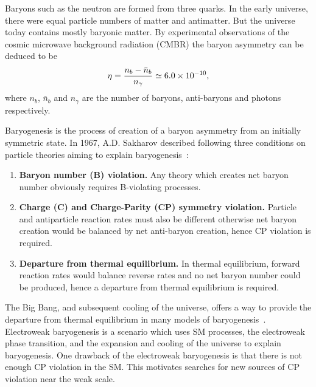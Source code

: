 Baryons such as the neutron are formed from three quarks. In the early universe, there were equal particle numbers of matter and antimatter. But the universe today contains mostly baryonic matter. By experimental observations of the cosmic microwave background radiation (CMBR) the baryon asymmetry can be deduced to be~\cite{expBar}
\begin{equation}\label{eq:baryons}
    \eta =\frac{n_b-\bar{n}_b}{n_\gamma}\simeq 6.0 \times 10^{-10}{\rm ,}
\end{equation}
where $n_b$, $\bar{n}_b$ and ${n_\gamma}$ are the number of baryons, anti-baryons and photons respectively. 



Baryogenesis is the process of creation of a baryon asymmetry from an initially symmetric state. In 1967, A.D. Sakharov described following three conditions on particle theories aiming to explain baryogenesis~\cite{Sakharov:1967dj}:
\begin{enumerate}
    \item {\bf Baryon number (B) violation.} Any theory which creates net baryon number obviously requires B-violating processes.
    \item {\bf Charge (C) and Charge-Parity (CP) symmetry violation.} Particle and antiparticle reaction rates must also be different otherwise net baryon creation would be balanced by net anti-baryon creation, hence CP violation is required.
    \item {\bf Departure from thermal equilibrium.} In thermal equilibrium, forward reaction rates would balance reverse rates and no net baryon number could be produced, hence a departure from thermal equilibrium is required.
\end{enumerate}

The Big Bang, and subsequent cooling of the universe, offers a way to provide the departure from thermal equilibrium in many models of baryogenesis~\cite{sakharov_3rd_cond}. Electroweak baryogenesis is a scenario which uses SM processes, the electroweak phase transition, and the expansion and cooling of the universe to explain baryogenesis. One drawback of the electroweak baryogenesis is that there is not enough CP violation in the SM. This motivates searches for new sources of CP violation near the weak scale.

